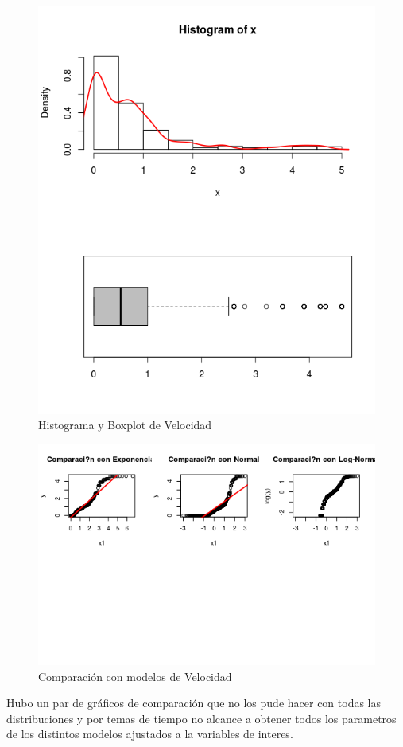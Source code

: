 \documentclass{article}
\begin{document}
\begin{enumerate}[a)]
\begin{figure}[h!]
\centering
\includegraphics[scale=0.5]{./figures/histplot_Velocidad.png}
\caption{Histograma y Boxplot de Velocidad}
\end{figure}

\begin{figure}[h!]
\centering
\includegraphics[scale=0.5]{./figures/cm_Velocidad.png}
\caption{Comparación con modelos de Velocidad}
\end{figure}
Hubo un par de gráficos de comparación que no los pude hacer con todas las distribuciones y por temas de tiempo no alcance a obtener todos los parametros de los distintos modelos ajustados a la variables de interes.



\end{enumerate}
\end{document}
